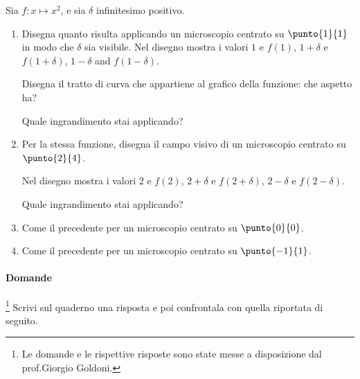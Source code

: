 \begin{esercizio}
Sia $f:x\mapsto x^2$,  e sia $\delta$ infinitesimo positivo.

\begin{enumerate} [noitemsep]
\item Disegna quanto risulta applicando un microscopio centrato su $\punto{1}{1}$
in modo che $\delta$ sia visibile.
Nel disegno mostra i valori $1$ e $f(1)$,  $1+\delta$ e 
$f(1+\delta)$,  $1-\delta$ and $f(1-\delta)$.

Disegna il tratto di curva che appartiene al grafico della funzione: che 
aspetto ha?

Quale ingrandimento stai applicando?

\item Per la stessa funzione, disegna il campo visivo di un microscopio
centrato su $\punto{2}{4}$.

Nel disegno mostra i valori $2$ e $f(2)$, $2+\delta$ e $f(2+\delta)$, 
$2-\delta$ e $f(2-\delta)$.

Quale ingrandimento stai applicando?

\item Come il precedente per un microscopio centrato su $\punto {0}{0}$.
\item Come il precedente per un microscopio centrato su $\punto {-1}{1}$.
\end{enumerate}
\end{esercizio}


\paragraph{Domande}
\footnote{Le domande e le rispettive risposte sono state messe a disposizione 
dal prof.Giorgio Goldoni.}
Scrivi sul quaderno una risposta e poi confrontala con quella riportata
di seguito.

